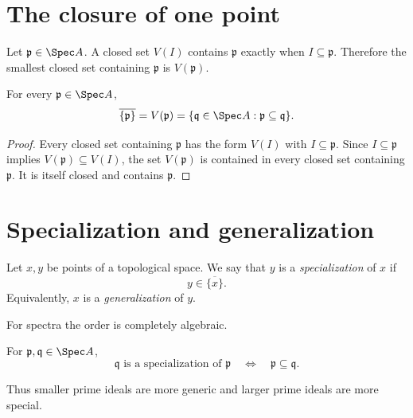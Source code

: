 \section{The closure of one point}

Let $\mathfrak p\in\Spec A$.  A closed set $V(I)$ contains $\mathfrak p$ exactly when
$I\subseteq\mathfrak p$.  Therefore the smallest closed set containing $\mathfrak p$ is
$V(\mathfrak p)$.

\begin{proposition}
For every $\mathfrak p\in\Spec A$,
\[
\overline{\{\mathfrak p\}}=V(\mathfrak p)
=\{\mathfrak q\in\Spec A:\mathfrak p\subseteq\mathfrak q\}.
\]
\end{proposition}

\begin{proof}
Every closed set containing $\mathfrak p$ has the form $V(I)$ with
$I\subseteq\mathfrak p$.  Since $I\subseteq\mathfrak p$ implies
$V(\mathfrak p)\subseteq V(I)$, the set $V(\mathfrak p)$ is contained in every closed
set containing $\mathfrak p$.  It is itself closed and contains $\mathfrak p$.
\end{proof}



\section{Specialization and generalization}

\begin{definition}
Let $x,y$ be points of a topological space.  We say that $y$ is a
\emph{specialization} of $x$ if
\[
y\in\overline{\{x\}}.
\]
Equivalently, $x$ is a \emph{generalization} of $y$.
\end{definition}

For spectra the order is completely algebraic.

\begin{theorem}
For $\mathfrak p,\mathfrak q\in\Spec A$,
\[
\mathfrak q\text{ is a specialization of }\mathfrak p
\quad\Longleftrightarrow\quad
\mathfrak p\subseteq\mathfrak q.
\]
\end{theorem}

Thus smaller prime ideals are more generic and larger prime ideals are more special.



